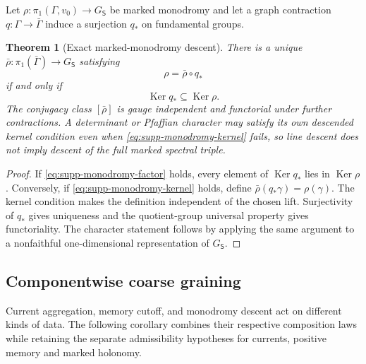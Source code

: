 \documentclass[11pt]{article}
\newtheorem{theorem}{Theorem}[section]
\theoremstyle{definition}
\theoremstyle{remark}
\theoremstyle{definition}
\theoremstyle{remark}
\newcommand{\Ker}{\operatorname{Ker}}
\begin{document}
Let $\rho:\pi_1(\Gamma,v_0)\to G_{\mathsf S}$ be marked monodromy and let a graph
contraction $q:\Gamma\to\bar\Gamma$ induce a surjection $q_*$ on fundamental
groups.

\begin{theorem}[Exact marked-monodromy descent]
\label{thm:supp-monodromy-descent}
There is a unique $\bar\rho:\pi_1(\bar\Gamma)\to G_{\mathsf S}$ satisfying
\begin{equation}
\rho=\bar\rho\circ q_*
\label{eq:supp-monodromy-factor}
\end{equation}
if and only if
\begin{equation}
{\Ker q_*\subseteq\Ker\rho.}
\label{eq:supp-monodromy-kernel}
\end{equation}
The conjugacy class $[\bar\rho]$ is gauge independent and functorial under further
contractions.  A determinant or Pfaffian character may satisfy its own descended
kernel condition even when \eqref{eq:supp-monodromy-kernel} fails, so line descent
does not imply descent of the full marked spectral triple.
\end{theorem}

\begin{proof}
If \eqref{eq:supp-monodromy-factor} holds, every element of $\Ker q_*$ lies in
$\Ker\rho$.  Conversely, if \eqref{eq:supp-monodromy-kernel} holds, define
$\bar\rho(q_*\gamma)=\rho(\gamma)$.  The kernel condition makes the definition
independent of the chosen lift.  Surjectivity of $q_*$ gives uniqueness and the
quotient-group universal property gives functoriality.  The character statement
follows by applying the same argument to a nonfaithful one-dimensional
representation of $G_{\mathsf S}$.
\end{proof}

\subsection{Componentwise coarse graining}

Current aggregation, memory cutoff, and monodromy descent act on different
kinds of data.  The following corollary combines their respective
composition laws while retaining the separate admissibility hypotheses
for currents, positive memory and marked holonomy.
\end{document}
